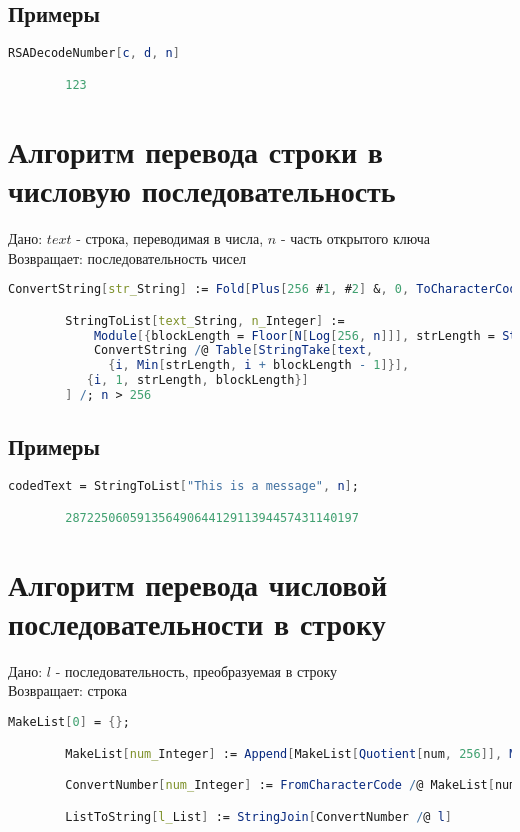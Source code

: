     	\subsection{Примеры}

    	\begin{lstlisting}[language=Mathematica,caption={
      		Пример	
    	}]
		RSADecodeNumber[c, d, n]

		123
    	\end{lstlisting}

	\section{Алгоритм перевода строки в числовую последовательность}
		Дано: $text$ - строка, переводимая в числа, $n$ - часть открытого ключа \\
		Возвращает: последовательность чисел

		\begin{lstlisting}[language=Mathematica,caption={
      		Перевод строки в числовую последовательность
    	}]
		ConvertString[str_String] := Fold[Plus[256 #1, #2] &, 0, ToCharacterCode[str]];

		StringToList[text_String, n_Integer] :=	
			Module[{blockLength = Floor[N[Log[256, n]]], strLength = StringLength[text]},    
       		ConvertString /@ Table[StringTake[text, 
              {i, Min[strLength, i + blockLength - 1]}],
           {i, 1, strLength, blockLength}]
     	] /; n > 256
    	\end{lstlisting}

    	\subsection{Примеры}

    	\begin{lstlisting}[language=Mathematica,caption={
      		Пример	
    	}]
		codedText = StringToList["This is a message", n];

		28722506059135649064412911394457431140197
    	\end{lstlisting}

	\section{Алгоритм перевода числовой последовательности в строку}
		Дано: $l$ - последовательность, преобразуемая в строку \\
		Возвращает: строка

		\begin{lstlisting}[language=Mathematica,caption={
      		Перевод числовой последовательности в строку
    	}]
		MakeList[0] = {};

		MakeList[num_Integer] := Append[MakeList[Quotient[num, 256]], Mod[num, 256]]

		ConvertNumber[num_Integer] := FromCharacterCode /@ MakeList[num]

		ListToString[l_List] := StringJoin[ConvertNumber /@ l]
    	\end{lstlisting}

